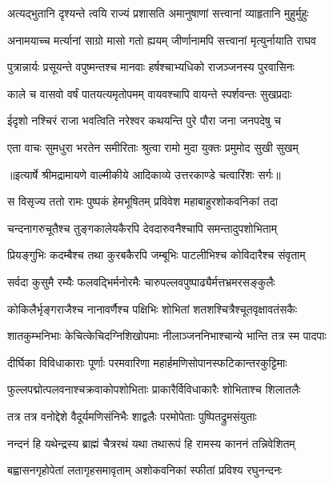 \twolineshloka
{अत्यद्भुतानि दृश्यन्ते त्वयि राज्यं प्रशासति}
{अमानुषाणां सत्त्वानां व्याहृतानि मुहुर्मुहुः} %

\twolineshloka
{अनामयाच्च मर्त्यानां साग्रो मासो गतो ह्ययम्}
{जीर्णानामपि सत्त्वानां मृत्युर्नायाति राघव} %

\twolineshloka
{पुत्रान्नार्यः प्रसूयन्ते वपुष्मन्तश्च मानवाः}
{हर्षश्चाभ्यधिको राजञ्जनस्य पुरवासिनः} %

\twolineshloka
{काले च वासवो वर्षं पातयत्यमृतोपमम्}
{वायवश्चापि वायन्ते स्पर्शवन्तः सुखप्रदाः} %

\twolineshloka
{ईदृशो नश्चिरं राजा भवत्विति नरेश्वर}
{कथयन्ति पुरे पौरा जना जनपदेषु च} %

\twolineshloka
{एता वाचः सुमधुरा भरतेन समीरिताः}
{श्रुत्वा रामो मुदा युक्तः प्रमुमोद सुखी सुखम्} %


{॥इत्यार्षे श्रीमद्रामायणे वाल्मीकीये आदिकाव्ये उत्तरकाण्डे चत्वारिंशः सर्गः॥}


\twolineshloka
{स विसृज्य ततो रामः पुष्पकं हेमभूषितम्}
{प्रविवेश महाबाहुरशोकवनिकां तदा} %

\twolineshloka
{चन्दनागरुचूतैश्च तुङ्गकालेयकैरपि}
{देवदारुवनैश्चापि समन्तादुपशोभिताम्} %

\twolineshloka
{प्रियङ्गुभिः कदम्बैश्च तथा कुरबकैरपि}
{जम्बूभिः पाटलीभिश्च कोविदारैश्च संवृताम्} %

\twolineshloka
{सर्वदा कुसुमै रम्यैः फलवद्भिर्मनोरमैः}
{चारुपल्लवपुष्पाढ्यैर्मत्तभ्रमरसङ्कुलैः} %

\twolineshloka
{कोकिलैर्भृङ्गराजैश्च नानावर्णैश्च पक्षिभिः}
{शोभितां शतशश्चित्रैश्चूतवृक्षावतंसकैः} %

\twolineshloka
{शातकुम्भनिभाः केचित्केचिदग्निशिखोपमाः}
{नीलाञ्जननिभाश्चान्ये भान्ति तत्र स्म पादपाः} %

\twolineshloka
{दीर्घिका विविधाकाराः पूर्णाः परमवारिणा}
{महार्हमणिसोपानस्फटिकान्तरकुट्टिमाः} %

\twolineshloka
{फुल्लपद्मोत्पलवनाश्चक्रवाकोपशोभिताः}
{प्राकारैर्विविधाकारैः शोभिताश्च शिलातलैः} %

\twolineshloka
{तत्र तत्र वनोद्देशे वैदूर्यमणिसंनिभैः}
{शाद्वलैः परमोपेताः पुष्पितद्रुमसंयुताः} %

\twolineshloka
{नन्दनं हि यथेन्द्रस्य ब्राह्मं चैत्ररथं यथा}
{तथारूपं हि रामस्य काननं तन्निवेशितम्} %

\twolineshloka
{बह्वासनगृहोपेतां लतागृहसमावृताम्}
{अशोकवनिकां स्फीतां प्रविश्य रघुनन्दनः} %

